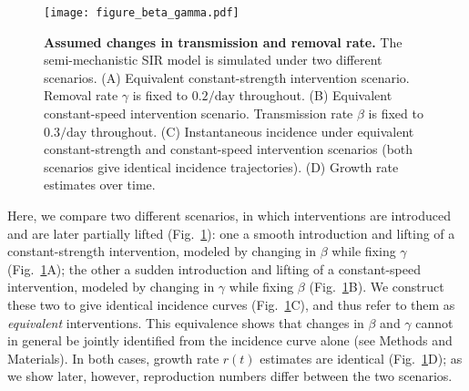 \documentclass[12pt]{article}
\newcommand{\fref}[1]{Fig.~\ref{fig:#1}}
\newcommand{\pday}{\ensuremath{/\textrm{day}}}
\begin{document}
\begin{figure}[!ht]
\texttt{[image: figure\_beta\_gamma.pdf]}
\caption{
\textbf{Assumed changes in transmission and removal rate.}
The semi-mechanistic SIR model is simulated under two different scenarios.
(A) Equivalent constant-strength intervention scenario.
Removal rate $\gamma$ is fixed to $0.2\pday$ throughout.
(B) Equivalent constant-speed intervention scenario.
Transmission rate $\beta$ is fixed to $0.3\pday$ throughout.
(C) Instantaneous incidence under equivalent constant-strength and constant-speed intervention scenarios (both scenarios give identical incidence trajectories).
(D) Growth rate estimates over time.
}
\label{fig:assumption}
\end{figure}

Here, we compare two different scenarios, in which interventions are introduced and are later partially lifted (\fref{assumption}): one a smooth introduction and lifting of a constant-strength intervention, modeled by changing in $\beta$ while fixing $\gamma$ (\fref{assumption}A); the other a sudden introduction and lifting of a constant-speed intervention, modeled by changing in $\gamma$ while fixing $\beta$ (\fref{assumption}B).
We construct these two to give identical incidence curves (\fref{assumption}C), and thus refer to them as \emph{equivalent} interventions.
This equivalence shows that changes in $\beta$ and $\gamma$ cannot in general be jointly identified from the incidence curve alone (see Methods and Materials).
In both cases, growth rate $r(t)$ estimates are identical (\fref{assumption}D); as we show later, however, reproduction numbers differ between the two scenarios.
\end{document}

